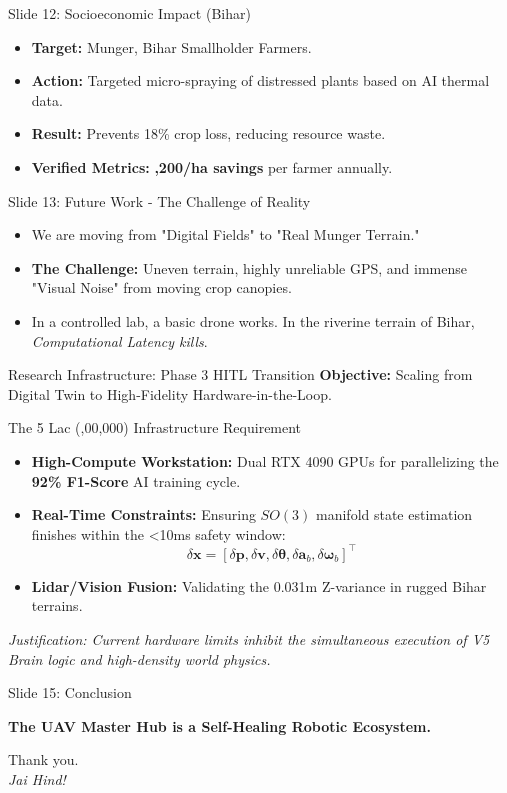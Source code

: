 \documentclass[aspectratio=169, xcolor=table]{beamer}
\begin{document}
\begin{frame}{Slide 12: Socioeconomic Impact (Bihar)}
    \begin{itemize}
        \item \textbf{Target:} Munger, Bihar Smallholder Farmers.
        \item \textbf{Action:} Targeted micro-spraying of distressed plants based on AI thermal data.
        \item \textbf{Result:} Prevents 18\% crop loss, reducing resource waste.
        \item \textbf{Verified Metrics:} \textbf{,200/ha savings} per farmer annually.
    \end{itemize}
\end{frame}

\begin{frame}{Slide 13: Future Work - The Challenge of Reality}
    \begin{itemize}
        \item We are moving from "Digital Fields" to "Real Munger Terrain."
        \item \textbf{The Challenge:} Uneven terrain, highly unreliable GPS, and immense "Visual Noise" from moving crop canopies.
        \item In a controlled lab, a basic drone works. In the riverine terrain of Bihar, \textit{Computational Latency kills}.
    \end{itemize}
\end{frame}

\begin{frame}{Research Infrastructure: Phase 3 HITL Transition}
    \textbf{Objective:} Scaling from Digital Twin to High-Fidelity Hardware-in-the-Loop.
    \begin{block}{The 5 Lac (,00,000) Infrastructure Requirement}
        \begin{itemize}
            \item \textbf{High-Compute Workstation:} Dual RTX 4090 GPUs for parallelizing the \textbf{92\% F1-Score} AI training cycle.
            \item \textbf{Real-Time Constraints:} Ensuring $SO(3)$ manifold state estimation finishes within the <10ms safety window:
            $$\delta \mathbf{x} = [\delta \mathbf{p}, \delta \mathbf{v}, \delta \boldsymbol{\theta}, \delta \mathbf{a}_b, \delta \boldsymbol{\omega}_b]^\top$$
            \item \textbf{Lidar/Vision Fusion:} Validating the 0.031m Z-variance in rugged Bihar terrains.
        \end{itemize}
    \end{block}
    \textit{Justification: Current hardware limits inhibit the simultaneous execution of V5 Brain logic and high-density world physics.}
\end{frame}

\begin{frame}{Slide 15: Conclusion}
    \begin{center}
        \Large{\textbf{The UAV Master Hub is a Self-Healing Robotic Ecosystem.}}
        
        \vspace{0.5cm}
        Thank you.\\
        \textit{Jai Hind!}
    \end{center}
\end{frame}
\end{document}
